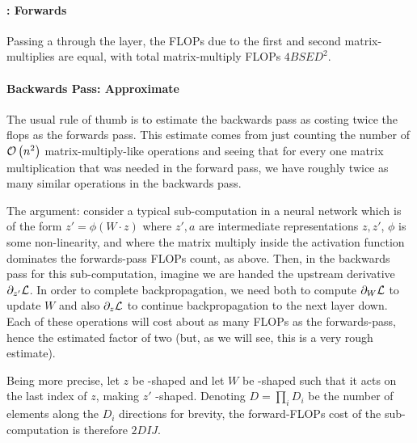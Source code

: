 \documentclass[11pt]{article}
\begin{document}
\paragraph{: Forwards}
Passing a  through the  layer, the FLOPs due to the
first and second matrix-multiplies are equal, with total matrix-multiply FLOPs  $ 4BSED ^{ 2 } $.

\paragraph{Backwards Pass: Approximate}


The usual rule of thumb is to estimate the backwards pass as costing twice the flops as the forwards
pass. This estimate comes from just counting the number of $ \mathcal{O} \left( n ^{ 2 } \right)$
matrix-multiply-like operations and seeing that for every one matrix multiplication that was needed
in the forward pass, we have roughly twice as many similar operations in the backwards pass.


The argument: consider a typical sub-computation in a neural network which is of the form $ z' =
	\phi \left ( W \cdot z \right ) $ where $ z', a $ are intermediate representations $ z, z' $, $ \phi
$ is some non-linearity, and where the matrix multiply inside the activation function dominates the
forwards-pass FLOPs count, as above.  Then, in the backwards pass for this sub-computation, imagine
we are handed the upstream derivative $ \partial _{ z '  } \mathcal{L} $. In order to complete
backpropagation, we need both to compute $ \partial  _{ W }\mathcal{L}  $ to update $ W $ and also $
	\partial  _{ z } \mathcal{L}  $ to continue backpropagation to the next layer down. Each of these operations
will cost about as many FLOPs as the forwards-pass, hence the estimated factor of two (but, as
we will see, this is a very rough estimate).

Being more precise, let $ z $ be -shaped and let $ W $ be
-shaped such that it acts on the last index of $ z $, making $ z' $
-shaped. Denoting $D=\prod _{ i } D _{ i } $ be the number of elements
along the $ D _{ i } $ directions for brevity, the forward-FLOPs cost of the sub-computation is
therefore $ 2DIJ$.
\end{document}
